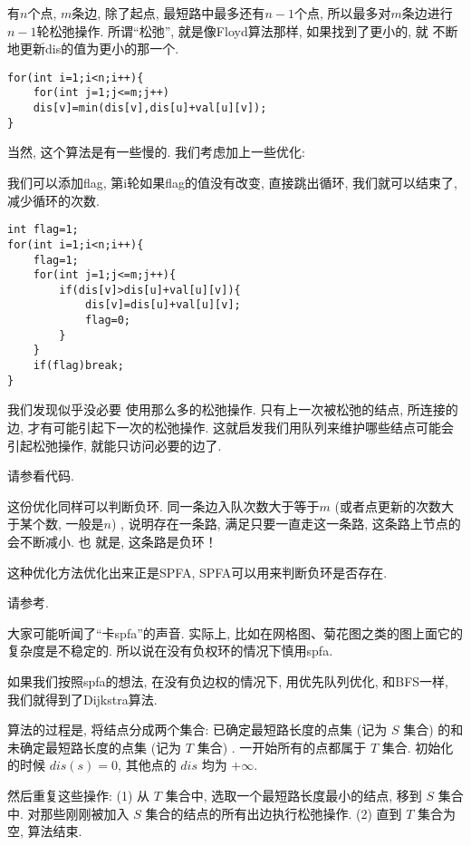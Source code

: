  有$n$个点, $m$条边, 除了起点, 最短路中最多还有$n-1$个点, 
所以最多对$m$条边进行$n-1$轮松弛操作. 所谓``松弛'', 就是像Floyd算法那样, 如果找到了更小的, 就
不断地更新dis的值为更小的那一个. 
\begin{lstlisting}
for(int i=1;i<n;i++){
    for(int j=1;j<=m;j++)
    dis[v]=min(dis[v],dis[u]+val[u][v]);
}    
\end{lstlisting}

当然, 这个算法是有一些慢的. 我们考虑加上一些优化: 

 我们可以添加flag, 第i轮如果flag的值没有改变, 直接跳出循环, 
我们就可以结束了, 减少循环的次数. 
\begin{lstlisting}
int flag=1;
for(int i=1;i<n;i++){
    flag=1;
    for(int j=1;j<=m;j++){
        if(dis[v]>dis[u]+val[u][v]){
            dis[v]=dis[u]+val[u][v];
            flag=0;
        }
    }
    if(flag)break;
}    
\end{lstlisting}

 我们发现似乎没必要
使用那么多的松弛操作. 只有上一次被松弛的结点, 所连接的边, 才有可能引起下一次的松弛操作. 
这就启发我们用队列来维护哪些结点可能会引起松弛操作, 就能只访问必要的边了. 

 请参看代码. 

这份优化同样可以判断负环. 同一条边入队次数大于等于$m$ (或者点更新的次数大于某个数, 一般是$n$) , 
说明存在一条路, 满足只要一直走这一条路, 这条路上节点的会不断减小. 也
就是, 这条路是负环！

这种优化方法优化出来正是SPFA, SPFA可以用来判断负环是否存在. 

 请参考.

大家可能听闻了``卡spfa''的声音. 实际上, 比如在网格图、菊花图之类的图上面它的复杂度是不稳定的. 
所以说在没有负权环的情况下慎用spfa. 

 如果我们按照spfa的想法, 在没有负边权的情况下, 用优先队列优化, 
和BFS一样, 我们就得到了Dijkstra算法. 

算法的过程是, 将结点分成两个集合: 已确定最短路长度的点集 (记为 $S$ 集合) 
的和未确定最短路长度的点集 (记为 $T$ 集合) . 一开始所有的点都属于 $T$ 集合. 
初始化的时候 $dis(s)=0$, 其他点的 $dis$ 均为 $+\infty$. 

然后重复这些操作: (1) 从 $T$ 集合中, 选取一个最短路长度最小的结点, 移到 $S$ 集合中. 
对那些刚刚被加入 $S$ 集合的结点的所有出边执行松弛操作. 
(2) 直到 $T$ 集合为空, 算法结束. 

